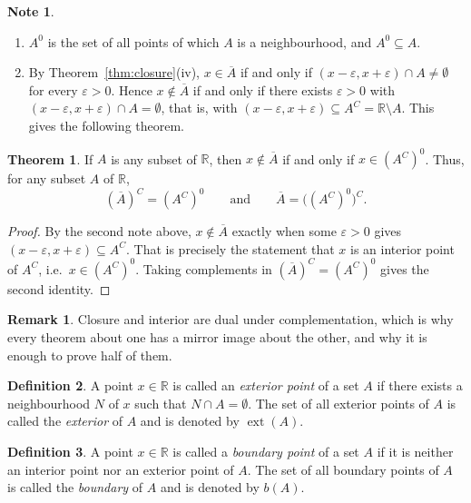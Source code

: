 \documentclass[11pt,a4paper]{article}
\numberwithin{equation}{section}
\theoremstyle{definition}
\newtheorem{thm}{Theorem}[subsection]
\newtheorem{defn}[thm]{Definition}
\newtheorem*{note}{Note}
\newtheorem*{remark}{Remark}
\begin{document}
\begin{note}
\begin{enumerate}
\item $A^0$ is the set of all points of which $A$ is a neighbourhood, and $A^0 \subseteq A$.
\item By Theorem~\ref{thm:closure}(iv), $x \in \overline{A}$ if and only if $(x - \varepsilon, x + \varepsilon) \cap A \neq \emptyset$ for every $\varepsilon > 0$. Hence $x\notin \overline{A}$ if and only if there exists $\varepsilon > 0$ with $(x - \varepsilon, x + \varepsilon ) \cap A = \emptyset$, that is, with $(x - \varepsilon, x + \varepsilon) \subseteq A^C = \mathbb{R} \setminus A$. This gives the following theorem.
\end{enumerate}
\end{note}


\begin{thm}
If $A$ is any subset of $\mathbb{R}$, then $x\notin \overline{A}$ if and only if $x\in (A^C)^0$. Thus, for any subset $A$ of $\mathbb{R}$,
$$(\overline{A})^C = (A^C)^0 \qquad\text{and}\qquad \overline{A} = \bigl((A^C)^0\bigr)^C.$$
\end{thm}

\begin{proof}
By the second note above, $x\notin\overline{A}$ exactly when some $\varepsilon>0$ gives $(x-\varepsilon,x+\varepsilon)\subseteq A^{C}$. That is precisely the statement that $x$ is an interior point of $A^{C}$, i.e.\ $x\in(A^{C})^{0}$. Taking complements in $(\overline{A})^C = (A^C)^0$ gives the second identity.
\end{proof}

\begin{remark}
Closure and interior are dual under complementation, which is why every theorem about one has a mirror image about the other, and why it is enough to prove half of them.
\end{remark}


\begin{defn}
A point $x\in \mathbb{R}$ is called an \emph{exterior point} of a set $A$ if there exists a neighbourhood $N$ of $x$ such that $N \cap A = \emptyset$. The set of all exterior points of $A$ is called the \emph{exterior} of $A$ and is denoted by $\operatorname{ext}(A)$.
\end{defn}


\begin{defn}
A point $x\in \mathbb{R}$ is called a \emph{boundary point} of a set $A$ if it is neither an interior point nor an exterior point of $A$. The set of all boundary points of $A$ is called the \emph{boundary} of $A$ and is denoted by $b(A)$.
\end{defn}
\end{document}
